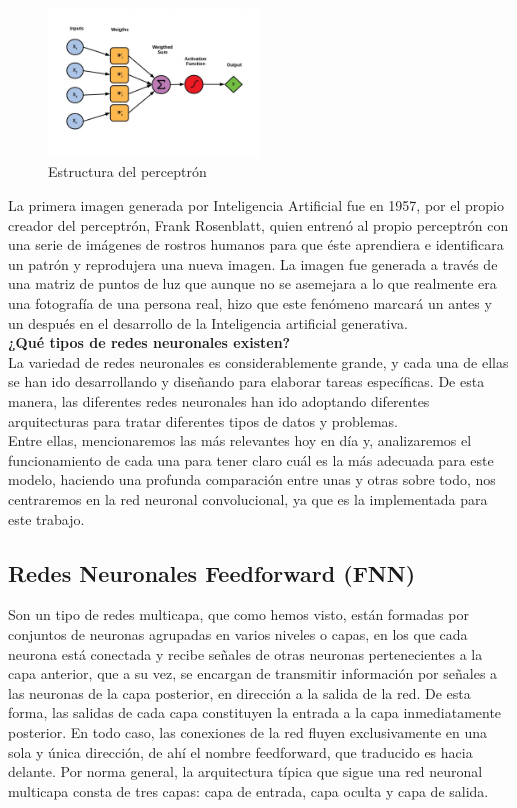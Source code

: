 \begin{figure}[h]
	\centering
	\includegraphics[width = 0.5\textwidth]{Imagenes/Vectorial/Perceptrones.jpeg}
	\caption{Estructura del perceptrón}
	\label{fig:perceptron}
\end{figure}

La primera imagen generada por Inteligencia Artificial fue en 1957, por el propio creador del perceptrón, Frank Rosenblatt, quien entrenó al propio perceptrón con una serie de imágenes de rostros humanos para que éste aprendiera e identificara un patrón y reprodujera una nueva imagen. La imagen fue generada a través de una matriz de puntos de luz que aunque no se asemejara a lo que realmente era una fotografía de una persona real, hizo que este fenómeno marcará un antes y un después en el desarrollo de la Inteligencia artificial generativa.\\

\textbf{¿Qué tipos de redes neuronales existen?}\\

La variedad de redes neuronales es considerablemente grande, y cada una de ellas se han ido desarrollando y diseñando para elaborar tareas específicas. De esta manera, las diferentes redes neuronales han ido adoptando diferentes arquitecturas para tratar diferentes tipos de datos y problemas.\\
Entre ellas, mencionaremos las más relevantes hoy en día y, analizaremos el funcionamiento de cada una para tener claro cuál es la más adecuada para este modelo, haciendo una profunda comparación entre unas y otras sobre todo, nos centraremos en la red neuronal convolucional, ya que es la implementada para este trabajo.

\subsection{Redes Neuronales Feedforward (FNN)}

Son un tipo de redes multicapa, que como hemos visto, están formadas por conjuntos de neuronas agrupadas en varios niveles o capas, en los que cada neurona está conectada y recibe señales de otras neuronas pertenecientes a la capa anterior, que a su vez, se encargan de transmitir información por señales a las neuronas de la capa posterior, en dirección a la salida de la red. De esta forma, las salidas de cada capa constituyen la entrada a la capa inmediatamente posterior. En todo caso, las conexiones de la red fluyen exclusivamente en una sola y única dirección, de ahí el nombre feedforward, que traducido es hacia delante. Por norma general, la arquitectura típica que sigue una red neuronal multicapa consta de tres capas: capa de entrada, capa oculta y capa de salida. \\

